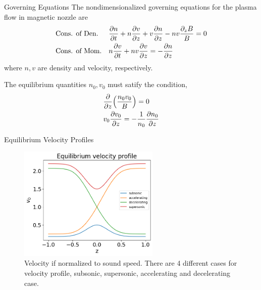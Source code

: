 \begin{frame}{Governing Equations}
  The nondimensionalized governing equations for the plasma flow in magnetic nozzle are 
  \begin{align}
    & \text{Cons. of Den.}  &&\pdv{n}{t} + n\pdv{v}{z} + v\pdv{n}{z} - nv\frac{\partial_z B}{B} = 0 \\
    & \text{Cons. of Mom.}  &&n\pdv{v}{t} + nv\pdv{v}{z} = -\pdv{n}{z}
  \end{align}
  where $n,v$ are density and velocity, respectively. 

  The equilibrium quantities $n_0, v_0$ must satify the condition, 
  \begin{align}
      &\pdv{z}(\frac{n_0v_0}{B}) = 0 \label{eq:equilibrium-convervation-of-mass}\\
      &v_0\pdv{v_0}{z} = -\frac{1}{n_0}\pdv{n_0}{z} \label{eq:equilibrium-convervation-of-momentum}
  \end{align}
\end{frame}

\begin{frame}{Equilibrium Velocity Profiles}
  \begin{figure}
    \begin{center}
      \includegraphics[width=0.6\textwidth]{figures/velocity-profiles.png}
    \end{center}
    \caption{Velocity if normalized to sound speed. There are 4 different cases for velocity profile, subsonic, supersonic, accelerating and decelerating case.}
    \label{fig:velocity-profiles}
  \end{figure}
\end{frame}

